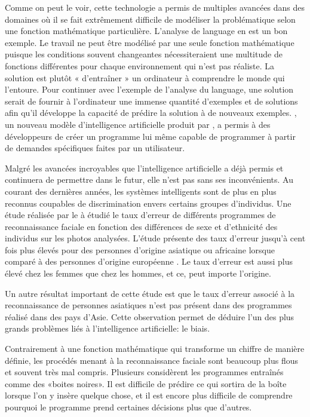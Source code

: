 \documentclass[letterpaper,10pt,french]{sphinxmanual}
\begin{document}
Comme on peut le voir, cette technologie a permis de multiples avancées dans des domaines où
il se fait extrêmement difficile de modéliser la problématique selon une
fonction mathématique particulière. L’analyse de language en est un bon exemple.
Le travail ne peut être modélisé par une seule fonction mathématique puisque
les conditions souvent changeantes nécessiteraient une multitude de fonctions
différentes pour chaque environnement qui n’est pas réaliste. La solution est
plutôt « d’entraîner » un ordinateur à comprendre le monde qui l’entoure.
Pour continuer avec l’exemple de l’analyse du language, une solution serait
de fournir à l’ordinateur une immense quantité d’exemples et de solutions afin
qu’il développe la capacité de prédire la solution à de nouveaux exemples.
,
un nouveau modèle d’intelligence artificielle produit par
, a permis à des développeurs de créer un programme
lui même capable de programmer à partir de demandes spécifiques faites par un
utilisateur.

Malgré les avancées incroyables que l’intelligence artificielle a déjà permis et
continuera de permettre dans le futur, elle n’est pas sans ses inconvénients. Au
courant des dernières années, les systèmes intelligents sont de plus en plus
reconnus coupables de discrimination envers certains groupes d’individus. Une
étude réalisée par le  à étudié le taux d’erreur de
différents programmes de reconnaissance faciale en fonction des différences de
sexe et d’ethnicité des individus sur les photos analysées. L’étude
présente des taux d’erreur
jusqu’à cent fois plus élevés pour des personnes d’origine asiatique ou
africaine lorsque comparé à des personnes d’origine européenne .
Le taux d’erreur est aussi plus élevé chez les femmes que chez les hommes, et
ce, peut importe l’origine.

Un autre résultat important de cette étude est que le taux d’erreur associé à la
reconnaissance de personnes asiatiques n’est pas présent dans des programmes
réalisé dans des pays d’Asie. Cette observation permet de déduire l’un des plus
grands problèmes liés à l’intelligence artificielle: le biais.

Contrairement à une fonction mathématique qui transforme un chiffre de manière
définie, les procédés menant à la reconnaissance faciale sont beaucoup plus
flous et souvent très mal compris. Plusieurs considèrent les programmes
entraînés comme des «boites noires». Il est difficile de prédire ce qui sortira
de la boîte lorsque l’on y insère quelque chose, et il est encore plus difficile
de comprendre pourquoi le programme prend certaines décisions plus que d’autres.
\end{document}
